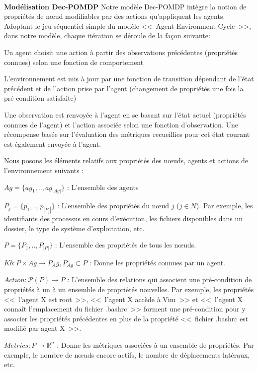 \documentclass[french]{pfia}
\begin{document}
\ 

\textbf{Modélisation Dec-POMDP} \quad Notre modèle Dec-POMDP intègre la notion de propriétés de nœud modifiables par des actions qu'appliquent les agents. Adoptant le jeu séquentiel simple du modèle <<~Agent Environment Cycle~>>\cite{jk2020}, dans notre modèle, chaque itération se déroule de la façon suivante:
\begin{enumerate*}[label=\roman*),itemjoin={;\quad}]
    \item Un agent choisit une action à partir des observations précédentes (propriétés connues) selon une fonction de comportement
    \item L'environnement est mis à jour par une fonction de transition dépendant de l'état précédent et de l'action prise par l'agent (changement de propriétés une fois la pré-condition satisfaite)
    \item Une observation est renvoyée à l'agent en se basant sur l'état actuel (propriétés connues de l'agent) et l'action associée selon une fonction d'observation. Une récompense basée sur l'évaluation des métriques recueillies pour cet état courant est également envoyée à l'agent.
\end{enumerate*}

Nous posons les éléments relatifs aux propriétés des nœuds, agents et actions de l'environnement suivants :

 $Ag = \{ag_1,..,ag_{|Ag|}\}$ : L'ensemble des agents
 
 $P_j = \{ p_1, .., p_{|P_{j}|} \}$ : L'ensemble des propriétés du nœud $j$ ($j \in N$). Par exemple, les identifiants des processus en cours d'exécution, les fichiers disponibles dans un dossier, le type de système d'exploitation, etc.

 $P = \{ P_1, .., P_{|P|} \}$ : L'ensemble des propriétés de tous les nœuds.

 $Kb: P \times Ag \rightarrow P_Ag, P_{Ag} \subset P$ : Donne les propriétés connues par un agent.

 $Action : \mathcal{P}(P) \rightarrow P$ : L'ensemble des relations qui associent une pré-condition de propriétés à un à un ensemble de propriétés nouvelles. Par exemple, les propriétés <<~l'agent X est root~>>, <<~l'agent X accède à Vim~>> et <<~l'agent X connaît l'emplacement du fichier .bashrc~>> forment une pré-condition pour y associer les propriétés précédentes en plus de la propriété <<~fichier .bashrc est modifié par agent X~>>.
 
 $Metrics: P \rightarrow \mathbb{R}^{n}$ : Donne les métriques associées à un ensemble de propriétés. Par exemple, le nombre de nœuds encore actifs, le nombre de déplacements latéraux, etc.
\end{document}
